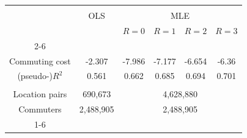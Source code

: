 \begin{tabular}{cc|cccc}
	\hline \\[-1.8ex]
	& \multicolumn{1}{c}{OLS} & \multicolumn{4}{c}{MLE}\\
	& & \(R = 0\) & \(R = 1\) & \(R = 2\) & \(R = 3\)\\\cline{2-6}
	&&\multicolumn{4}{c}{}\vspace{-5pt}\\
	Commuting cost & -2.307 & -7.986 & -7.177 & -6.654 & -6.36\\
	(pseudo-)\(R^2\) & 0.561 & 0.662 & 0.685 & 0.694 & 0.701\\
	&&\multicolumn{4}{c}{}\vspace{-3pt}\\
	Location pairs & 690,673 & \multicolumn{4}{c}{4,628,880}\\
	Commuters & 2,488,905 & \multicolumn{4}{c}{2,488,905}\\\cline{1-6}
	\vspace{-10pt}
\end{tabular}